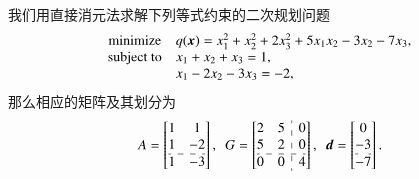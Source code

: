 \begin{eg}
\label{eg:7.2.1}
我们用直接消元法求解下列等式约束的二次规划问题
\begin{equation*}
\begin{array}{cl}
\text{minimize} & q({\bm{x}}) = x_1^2 + x_2^2 + 2x_3^2 + 5x_1x_2 - 3x_2 - 7x_3, \\
\text{subject to} & x_1 + x_2 + x_3 = 1, \\
& x_1 - 2x_2 - 3x_3 = -2,
\end{array}
\end{equation*}
那么相应的矩阵及其划分为
\begin{equation*}
A = \left[\begin{array}{@{}cc@{}} 1 & 1 \\ 1 & -2 \\ \hdashline 1 & -3 \end{array}\right], ~~ G = \left[\begin{array}{@{}cc:c@{}} 2 & 5 & 0 \\ 5 & 2 & 0 \\ \hdashline 0 & 0 & 4 \end{array}\right], ~~ \V{d} = \left[\begin{array}{@{}c@{}} 0 \\ -3 \\ \hdashline -7 \end{array}\right].
\end{equation*}


\end{eg}
